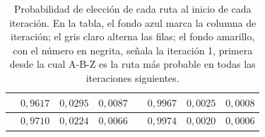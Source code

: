 \begin{table}[H]
\begin{tabular}{|c|c|c|c|c|c|c|c|}
\hline
\cellcolor{iteracion}{\bfseries\boldmath $9$} & $0{,}9617$ & $0{,}0295$ & $0{,}0087$ & \cellcolor{iteracion}{\bfseries\boldmath $19$} & $0{,}9967$ & $0{,}0025$ & $0{,}0008$ \\
\hline
\cellcolor{iteracion}{\bfseries\boldmath $10$} & \cellcolor{cebra}$0{,}9710$ & \cellcolor{cebra}$0{,}0224$ & \cellcolor{cebra}$0{,}0066$ & \cellcolor{iteracion}{\bfseries\boldmath $20$} & \cellcolor{cebra}$0{,}9974$ & \cellcolor{cebra}$0{,}0020$ & \cellcolor{cebra}$0{,}0006$ \\
\hline
\end{tabular}
\caption{Probabilidad de elección de cada ruta al inicio de cada iteración. En la tabla, el fondo azul marca la columna de iteración; el gris claro alterna las filas; el fondo amarillo, con el número en negrita, señala la iteración 1, primera desde la cual A-B-Z es la ruta más probable en todas las iteraciones siguientes.}
\label{tab:p4b-probabilidades}
\end{table}
